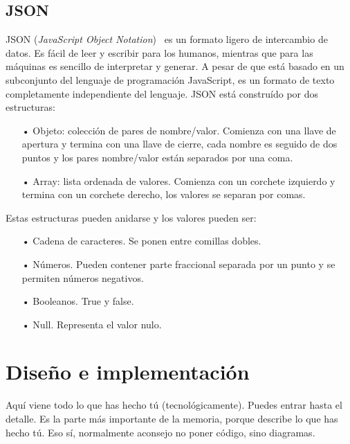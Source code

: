 \documentclass[a4paper, 12pt]{book}
\begin{document}
\section{JSON} 
\label{sec:JSON}

JSON (\emph{JavaScript Object Notation})~\cite{Pagina_de_JSON} es un formato ligero de intercambio de datos. Es fácil de leer y escribir para los humanos, mientras que para las máquinas es sencillo de interpretar y generar. A pesar de que está basado en un subconjunto del lenguaje de programación JavaScript, es un formato de texto completamente independiente del lenguaje. JSON está construído por dos estructuras:

\begin{itemize}
	\item[•] Objeto: colección de pares de nombre/valor. Comienza con una llave de apertura y termina con una llave de cierre, cada nombre es seguido de dos puntos y los pares nombre/valor están separados por una coma.
	\item[•] Array: lista ordenada de valores. Comienza con un corchete izquierdo y termina con un corchete derecho, los valores se separan por comas.
\end{itemize}

Estas estructuras pueden anidarse y los valores pueden ser:
	\begin{itemize}
		\item[•] Cadena de caracteres. Se ponen entre comillas dobles.
		\item[•] Números. Pueden contener parte fraccional separada por un punto y se permiten números negativos.
		\item[•] Booleanos. True y false.
		\item[•] Null. Representa el valor nulo.
	\end{itemize}




\cleardoublepage
\chapter{Diseño e implementación}

Aquí viene todo lo que has hecho tú (tecnológicamente). 
Puedes entrar hasta el detalle. 
Es la parte más importante de la memoria, porque describe lo que has hecho tú.
Eso sí, normalmente aconsejo no poner código, sino diagramas.
\end{document}
